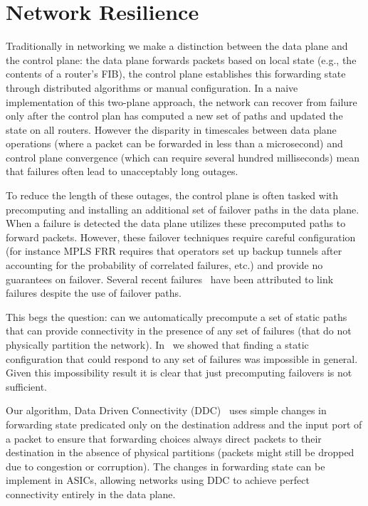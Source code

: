 \documentclass[letterpaper]{article}
\begin{document}
\section*{Network Resilience}
Traditionally in networking we make a distinction between the data plane and the control plane: the data plane forwards
packets based on local state (e.g., the contents of a router's FIB), the control plane establishes this forwarding state
through distributed algorithms or manual configuration. In a naive implementation of this two-plane approach, the
network can recover from failure only after the control plan has computed a new set of paths and updated the state on
all routers. However the disparity in timescales between data plane operations (where a packet can be forwarded in less
than a microsecond) and control plane convergence (which can require several hundred milliseconds) mean that failures
often lead to unacceptably long outages.

To reduce the length of these outages, the control plane is often tasked with precomputing and installing an additional
set of failover paths in the data plane. When a failure is detected the data plane utilizes these precomputed paths to
forward packets. However, these failover techniques require careful configuration (for instance MPLS FRR requires that
operators set up backup tunnels after accounting for the probability of correlated failures, etc.) and provide no
guarantees on failover. Several recent failures~\cite{sprint2006, emea2008, wiki2012} have been attributed to link
failures despite the use of failover paths. 

This begs the question: can we automatically precompute a set of static paths that can provide connectivity in the
presence of any set of failures (that do not physically partition the network). In~\cite{feigenbaum12resilience} we
showed that finding a static configuration that could respond to any set of failures was impossible in general. Given
this impossibility result it is clear that just precomputing failovers is not sufficient.

Our algorithm, Data Driven Connectivity (DDC)~\cite{liu13ddc} uses simple changes in forwarding state predicated
only on the destination address and the input port of a packet to ensure that forwarding choices always direct packets
to their destination in the absence of physical partitions (packets might still be dropped due to congestion or
corruption). The changes in forwarding state can be implement in ASICs, allowing networks using DDC to achieve perfect
connectivity entirely in the data plane.
\end{document}
